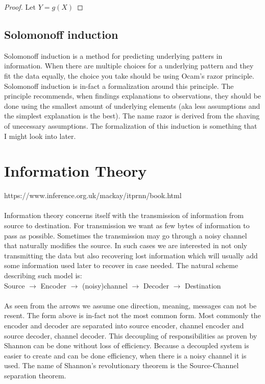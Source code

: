 \documentclass{article}
\newtheorem{proof}{Proof}
\begin{document}
\begin{proof}
    Let $Y = g(X)$
    
\end{proof}

\subsection{Solomonoff induction}

Solomonoff induction is a method for predicting underlying patters in information. 
When there are multiple choices for a underlying pattern and they fit the data 
equally, the choice you take should be using Ocam's razor principle. 
Solomonoff induction is in-fact a formalization around this principle. 
The principle recommends, when findings explanations to observations, they should 
be done using the smallest amount of underlying elements (aka less assumptions 
and the simplest explanation is the best).
The name razor is derived from the shaving of unecessary assumptions.
The formalization of this induction is something that I might look into later.


\section{Information Theory}
https://www.inference.org.uk/mackay/itprnn/book.html \\ \\
Information theory concerns itself with the transmission of information from source to 
destination. For transmission we want as few bytes of information to pass as possible. 
Sometimes the transmission may go through a noisy channel that naturally modifies 
the source. In such cases we are interested in not only transmitting the data but also 
recovering lost information which will usually add some information used later to recover
in case needed. The natural scheme describing such model is: \\

Source $\to$ Encoder $\to$ (noisy)channel $\to$ Decoder $\to$ Destination \\ \\
As seen from the arrows we assume one direction, meaning, messages can not be resent.
The form above is in-fact not the most common form. Most commonly the encoder and 
decoder are separated into source encoder, channel encoder and source decoder, 
channel decoder. This decoupling of responsibilities as proven by Shannon can be done 
without loss of efficiency. Because a decoupled system is easier to create and can be done
efficiency, when there is a noisy channel it is used. The name of Shannon's revolutionary 
theorem is the Source-Channel separation theorem.
\end{document}
